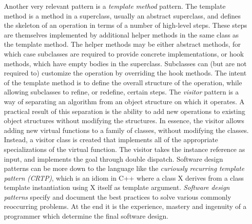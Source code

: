 \quad Another very relevant pattern is a \textit{template method} pattern. The template method is a method in a superclass, usually an abstract superclass, and defines the skeleton of an operation in terms of a number of high-level steps. These steps are themselves implemented by additional helper methods in the same class as the template method. The helper methods may be either abstract methods, for which case subclasses are required to provide concrete implementations, or hook methods, which have empty bodies in the superclass. Subclasses can (but are not required to) customize the operation by overriding the hook methods. The intent of the template method is to define the overall structure of the operation, while allowing subclasses to refine, or redefine, certain steps.\newline\null
\quad The \textit{visitor} pattern is a way of separating an algorithm from an object structure on which it operates. A practical result of this separation is the ability to add new operations to existing object structures without modifying the structures. In essence, the visitor allows adding new virtual functions to a family of classes, without modifying the classes. Instead, a visitor class is created that implements all of the appropriate specializations of the virtual function. The visitor takes the instance reference as input, and implements the goal through double dispatch.\newline\null
\quad Software design patterns can be more down to the language like the \textit{curiously recurring template pattern (CRTP)}, which is an idiom in C++ where a class X derives from a class template instantiation using X itself as template argument.\newline\null
\quad \textit{Software design patterns} specify and document the best practices to solve various commonly reoccurring problems. At the end it is the experience, mastery and ingenuity of a programmer which determine the final software design.  

